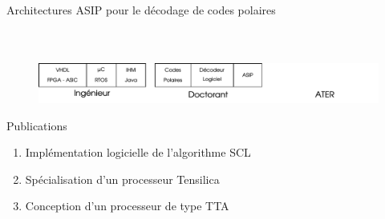 \documentclass[t,compress,mathserif,12pt,xcolor=dvipsnames]{beamer}
\begin{document}
\begin{frame}[t]{Architectures ASIP pour le décodage de codes polaires}
\begin{minipage}[t][5.0cm][t]{\textwidth}
\begin{columns}[T]
\begin{column}{0.40\textwidth}
{\begin{table}
{{\begin{tabular}{c|c|c|c|c}
        \bottomrule
      \end{tabular}
      }}
    \end{table}
    }


      \end{column}
    \end{columns}
  \end{minipage}
  \begin{figure}[htp]
    \centering
    \includegraphics[width=\textwidth]{fig/frise7}
  \end{figure}


\end{frame}

\begin{frame}[c]{Publications}

  \begin{enumerate}
\renewcommand{\section}[2]{} %

    \renewcommand*{\bibfont}{\scriptsize}
    \nocite{leonardon_fast_2017,leonardon_custom_2018,ghaffari_improving_2017,leonardon_tta_2018,Ghaffari2018,cassagne_fast_2017,cassagne_gdr_2017,leonardon_custom_2018}
    \vfill
    \item<+-> Implémentation logicielle de l'algorithme  SCL
    \scriptsize{\printbibliography[keyword={fast-scl}]}
    \vfill
    \item<+-> Spécialisation d'un processeur Tensilica
    \scriptsize{\printbibliography[keyword={tensilica}]}
    \vfill
    \item<+-> Conception d'un processeur de type TTA
    \scriptsize{\printbibliography[keyword={tta}]}
    \vfill
  \end{enumerate}

\end{frame}
\end{document}
